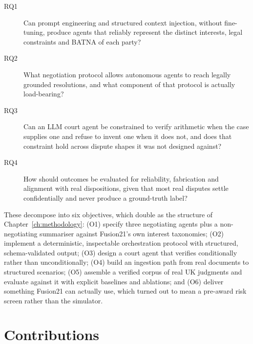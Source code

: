 \begin{description}
  \item[RQ1] Can prompt engineering and structured context injection, without
    fine-tuning, produce agents that reliably represent the distinct interests,
    legal constraints and BATNA of each party?
  \item[RQ2] What negotiation protocol allows autonomous agents to reach
    legally grounded resolutions, and what component of that protocol is actually
    load-bearing?
  \item[RQ3] Can an LLM court agent be constrained to verify arithmetic when the
    case supplies one and refuse to invent one when it does not, and does that
    constraint hold across dispute shapes it was not designed against?
  \item[RQ4] How should outcomes be evaluated for reliability, fabrication and
    alignment with real dispositions, given that most real disputes settle
    confidentially and never produce a ground-truth label?
\end{description}

These decompose into six objectives, which double as the structure of
Chapter~\ref{ch:methodology}: (O1) specify three negotiating agents plus a
non-negotiating summariser against Fusion21's own interest taxonomies; (O2)
implement a deterministic, inspectable orchestration protocol with structured,
schema-validated output; (O3) design a court agent that verifies conditionally
rather than unconditionally; (O4) build an ingestion path from real documents to
structured scenarios; (O5) assemble a verified corpus of real UK judgments and
evaluate against it with explicit baselines and ablations; and (O6) deliver
something Fusion21 can actually use, which turned out to mean a pre-award risk
screen rather than the simulator.

\section{Contributions}
\label{sec:contributions}

